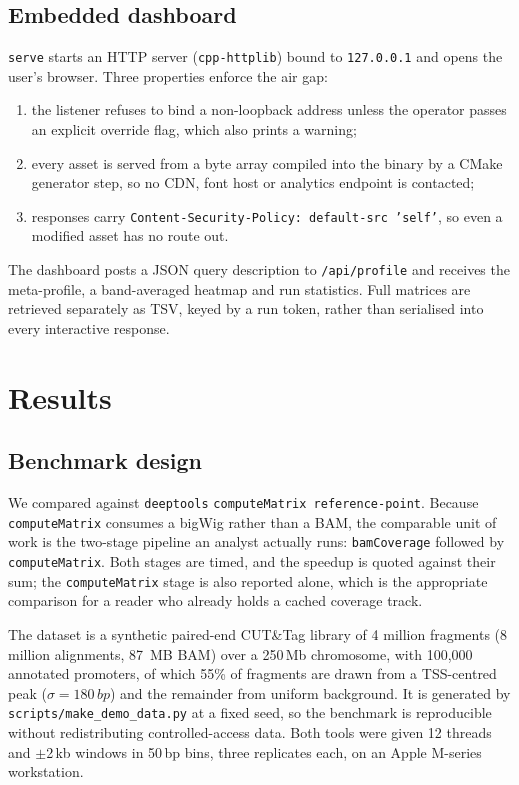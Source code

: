 \documentclass[11pt,a4paper]{article}
\newcommand{\NumRegions}{100{,}000}
\newcommand{\NumFragments}{4}            %
\newcommand{\NumAlignments}{8}           %
\newcommand{\BamSize}{87}                %
\newcommand{\NumCores}{12}
\newcommand{\WindowSpec}{$\pm$2\,kb}
\newcommand{\BinSize}{50}
\begin{document}
\subsection{Embedded dashboard}

\texttt{serve} starts an HTTP server (\texttt{cpp-httplib}) bound to
\texttt{127.0.0.1} and opens the user's browser. Three properties enforce the
air gap:

\begin{enumerate}\itemsep2pt
  \item the listener refuses to bind a non-loopback address unless the operator
        passes an explicit override flag, which also prints a warning;
  \item every asset is served from a byte array compiled into the binary by a
        CMake generator step, so no CDN, font host or analytics endpoint is
        contacted;
  \item responses carry \texttt{Content-Security-Policy: default-src 'self'},
        so even a modified asset has no route out.
\end{enumerate}

The dashboard posts a JSON query description to \texttt{/api/profile} and
receives the meta-profile, a band-averaged heatmap and run statistics. Full
matrices are retrieved separately as TSV, keyed by a run token, rather than
serialised into every interactive response.

\section{Results}

\subsection{Benchmark design}

We compared against \texttt{deeptools} \texttt{computeMatrix reference-point}.
Because \texttt{computeMatrix} consumes a bigWig rather than a BAM, the
comparable unit of work is the two-stage pipeline an analyst actually runs:
\texttt{bamCoverage} followed by \texttt{computeMatrix}. Both stages are timed,
and the speedup is quoted against their sum; the \texttt{computeMatrix} stage is
also reported alone, which is the appropriate comparison for a reader who
already holds a cached coverage track.

The dataset is a synthetic paired-end CUT\&Tag library of \NumFragments{}
million fragments (\NumAlignments{} million alignments, \BamSize{}~MB BAM) over
a 250\,Mb chromosome, with \NumRegions{} annotated promoters, of
which 55\% of fragments are drawn from a TSS-centred peak
($\sigma = 180\,bp$) and the remainder from uniform background. It is
generated by \texttt{scripts/make\_demo\_data.py} at a fixed seed, so the
benchmark is reproducible without redistributing controlled-access data. Both
tools were given \NumCores{} threads and \WindowSpec{} windows in
\BinSize\,bp bins, three replicates each, on an Apple M-series
workstation.
\end{document}
